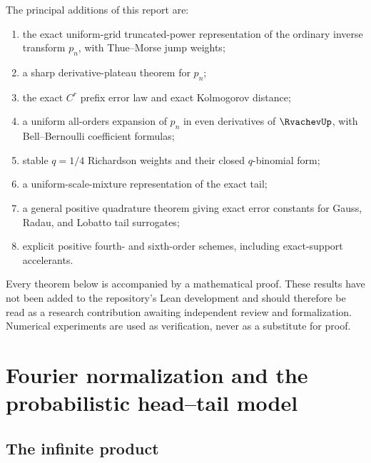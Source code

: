 \documentclass[11pt,oneside]{article}
\numberwithin{equation}{section}
\theoremstyle{definition}
\theoremstyle{remark}
\begin{document}
The principal additions of this report are:
\begin{enumerate}[leftmargin=2.1em]
\item the exact uniform-grid truncated-power representation of the ordinary inverse
      transform $p_n$, with Thue--Morse jump weights;
\item a sharp derivative-plateau theorem for $p_n$;
\item the exact $C^r$ prefix error law and exact Kolmogorov distance;
\item a uniform all-orders expansion of $p_n$ in even derivatives of $\RvachevUp$, with
      Bell--Bernoulli coefficient formulas;
\item stable $q=1/4$ Richardson weights and their closed $q$-binomial form;
\item a uniform-scale-mixture representation of the exact tail;
\item a general positive quadrature theorem giving exact error constants for Gauss,
      Radau, and Lobatto tail surrogates;
\item explicit positive fourth- and sixth-order schemes, including exact-support
      accelerants.
\end{enumerate}
Every theorem below is accompanied by a mathematical proof.  These results have not
been added to the repository's Lean development and should therefore be read as a
research contribution awaiting independent review and formalization.  Numerical
experiments are used as verification, never as a substitute for proof.

\section{Fourier normalization and the probabilistic head--tail model}
\label{p3:sec:model}

\subsection{The infinite product}
\end{document}
